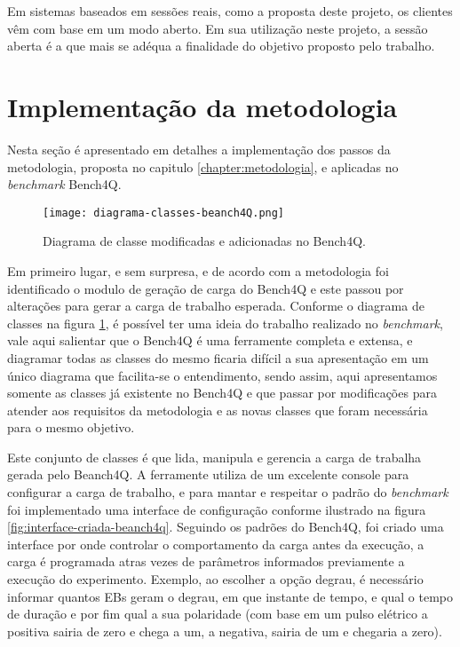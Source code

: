 Em sistemas baseados em sessões reais, como a proposta deste projeto, os clientes vêm com base em um modo aberto. Em sua utilização neste projeto, a sessão aberta é a que mais se adéqua a finalidade do objetivo proposto pelo trabalho.

\section{Implementação da metodologia}

Nesta seção é apresentado em detalhes a implementação dos passos da metodologia, proposta no capitulo \ref{chapter:metodologia}, e aplicadas no \textit{benchmark} Bench4Q.

\begin{figure}[htb]
	\caption{Diagrama de classe modificadas e adicionadas no Bench4Q.}
	\label{fig:diagrama-classes}
	\centering
	\texttt{[image: diagrama-classes-beanch4Q.png]}	
\end{figure}
	
Em primeiro lugar, e sem surpresa, e de acordo com a metodologia foi identificado o modulo de geração de carga do Bench4Q e este passou por alterações para gerar a carga de trabalho esperada. Conforme o diagrama de classes na figura \ref{fig:diagrama-classes}, é possível ter uma ideia do trabalho realizado no \textit{benchmark}, vale aqui salientar que o Bench4Q é uma ferramente completa e extensa, e diagramar todas as classes do mesmo ficaria difícil a sua apresentação em um único diagrama que facilita-se o entendimento, sendo assim, aqui apresentamos somente as classes já existente no Bench4Q e que passar por modificações para atender aos requisitos da metodologia e as novas classes que foram necessária para o mesmo objetivo.
 
	
Este conjunto de classes é que lida, manipula e gerencia a carga de trabalha gerada pelo Beanch4Q. A ferramente utiliza de um excelente console para configurar a carga de trabalho, e para mantar e respeitar o padrão do \textit{benchmark} foi implementado uma interface de configuração conforme ilustrado na figura \ref{fig:interface-criada-beanch4q}. Seguindo os padrões do Bench4Q, foi criado uma interface por onde controlar o comportamento da carga antes da execução, a carga é programada atras vezes de parâmetros informados previamente a execução do experimento. Exemplo, ao escolher a opção degrau, é necessário informar quantos EBs geram o degrau, em que instante de tempo, e qual o tempo de duração e por fim qual a sua polaridade (com base em um pulso elétrico a positiva sairia de zero e chega a um, a negativa, sairia de um e chegaria a zero).

